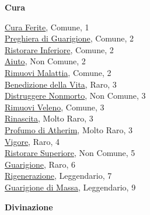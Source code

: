 \begin{multicols}{3}
{{\medskip\textbf{Cura}

\hyperlink{Cura Ferite}{Cura Ferite}, Comune, 1\\
\hyperlink{Preghiera di Guarigione}{Preghiera di Guarigione}, Comune, 2\\
\hyperlink{Ristorare Inferiore}{Ristorare Inferiore}, Comune, 2\\
\hyperlink{Aiuto}{Aiuto}, Non Comune, 2\\
\hyperlink{Rimuovi Malattia}{Rimuovi Malattia}, Comune, 2\\
\hyperlink{Benedizione della Vita}{Benedizione della Vita}, Raro, 3\\
\hyperlink{Distruggere nonmorto}{Distruggere Nonmorto}, Non Comune, 3\\
\hyperlink{Rimuovi Veleno}{Rimuovi Veleno}, Comune, 3\\
\hyperlink{Rinascita}{Rinascita}, Molto Raro, 3\\
\hyperlink{Profumo di Atherim}{Profumo di Atherim}, Molto Raro, 3\\
\hyperlink{Vigore}{Vigore}, Raro, 4\\
\hyperlink{Ristorare Superiore}{Ristorare Superiore}, Non Comune, 5\\
\hyperlink{Guarigione}{Guarigione}, Raro, 6\\
\hyperlink{Rigenerazione}{Rigenerazione}, Leggendario, 7\\
\hyperlink{Guarigione di Massa}{Guarigione di Massa}, Leggendario, 9

\medskip\textbf{Divinazione}

}}
\end{multicols}
